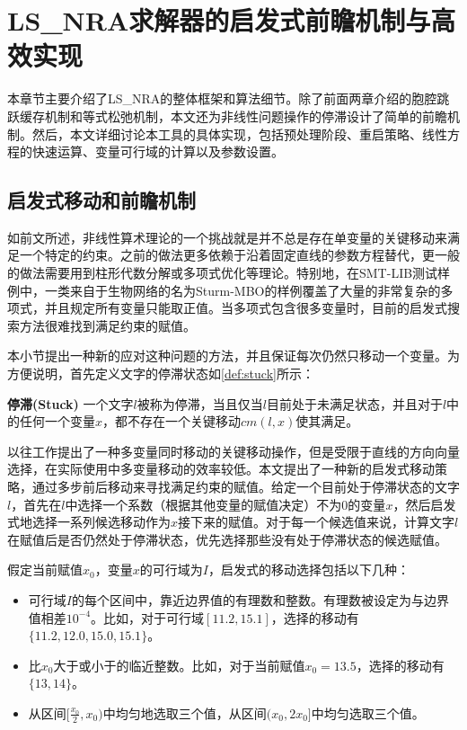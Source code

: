 \chapter{LS\_NRA求解器的启发式前瞻机制与高效实现}\label{chap:implementation}

本章节主要介绍了LS\_NRA的整体框架和算法细节。除了前面两章介绍的胞腔跳跃缓存机制和等式松弛机制，本文还为非线性问题操作的停滞设计了简单的前瞻机制。然后，本文详细讨论本工具的具体实现，包括预处理阶段、重启策略、线性方程的快速运算、变量可行域的计算以及参数设置。

\section{启发式移动和前瞻机制}
如前文所述，非线性算术理论的一个挑战就是并不总是存在单变量的关键移动来满足一个特定的约束。之前的做法更多依赖于沿着固定直线的参数方程替代\cite{LiXZ23}，更一般的做法需要用到柱形代数分解或多项式优化等理论。特别地，在SMT-LIB测试样例中，一类来自于生物网络\cite{AkutsuHT08}的名为Sturm-MBO的样例覆盖了大量的非常复杂的多项式，并且规定所有变量只能取正值。当多项式包含很多变量时，目前的启发式搜索方法很难找到满足约束的赋值。

本小节提出一种新的应对这种问题的方法，并且保证每次仍然只移动一个变量。为方便说明，首先定义文字的停滞状态如\ref{def:stuck}所示：

\begin{definition}{\textbf{停滞(Stuck)}}
    一个文字$l$被称为停滞，当且仅当$l$目前处于未满足状态，并且对于$l$中的任何一个变量$x$，都不存在一个关键移动$cm(l, x)$使其满足。
\label{def:stuck}
\end{definition}

以往工作\cite{LiXZ23}提出了一种多变量同时移动的关键移动操作，但是受限于直线的方向向量选择，在实际使用中多变量移动的效率较低。本文提出了一种新的启发式移动策略，通过多步前后移动来寻找满足约束的赋值。给定一个目前处于停滞状态的文字$l$，首先在$l$中选择一个系数（根据其他变量的赋值决定）不为0的变量$x$，然后启发式地选择一系列候选移动作为$x$接下来的赋值。对于每一个候选值来说，计算文字$l$在赋值后是否仍然处于停滞状态，优先选择那些没有处于停滞状态的候选赋值。

假定当前赋值$x_0$，变量$x$的可行域为$I$，启发式的移动选择包括以下几种：
\begin{itemize}
    \item 可行域$I$的每个区间中，靠近边界值的有理数和整数。有理数被设定为与边界值相差$10^{-4}$。比如，对于可行域$[11.2, 15.1]$，选择的移动有$\{11.2, 12.0, 15.0, 15.1\}$。
    \item 比$x_0$大于或小于的临近整数。比如，对于当前赋值$x_0 = 13.5$，选择的移动有$\{13, 14\}$。
    \item 从区间$[\frac{x_0}{2}, x_0)$中均匀地选取三个值，从区间$(x_0, 2x_0]$中均匀选取三个值。
\label{en:look-ahead}
\end{itemize}

